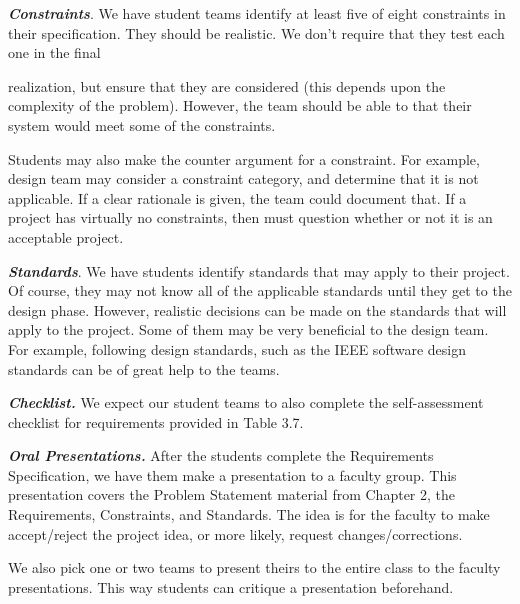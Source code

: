 \begin{enumerate}
\begin{onlysolution}
\emph{\textbf{Constraints}}. We have student teams identify at least
five of eight constraints in their specification. They should be
realistic. We don't require that they test each one in the final

realization, but ensure that they are considered (this depends upon the
complexity of the problem). However, the team should be able to that
their system would meet some of the constraints.

Students may also make the counter argument for a constraint. For
example, design team may consider a constraint category, and determine
that it is not applicable. If a clear rationale is given, the team could
document that. If a project has virtually no constraints, then must
question whether or not it is an acceptable project.

\emph{\textbf{Standards}}. We have students identify standards that
may apply to their project. Of course, they may not know all of
the applicable standards until they get to the design phase.
However, realistic decisions can be made on the standards that will
apply to the project. Some of them may be very beneficial to the design
team. For example, following design standards, such as the IEEE software
design standards can be of great help to the teams.

\emph{\textbf{Checklist.}} We expect our student teams to also complete
the self-assessment checklist for requirements provided in Table 3.7.

\emph{\textbf{Oral Presentations.}} After the students complete the
Requirements Specification, we have them make a presentation to a
faculty group. This presentation covers the Problem Statement material
from Chapter 2, the Requirements, Constraints, and Standards. The idea
is for the faculty to make accept/reject the project idea, or more
likely, request changes/corrections.

We also pick one or two teams to present theirs to the entire class
 to the faculty presentations. This way students can
critique a presentation beforehand.

\end{onlysolution}

\end{enumerate}